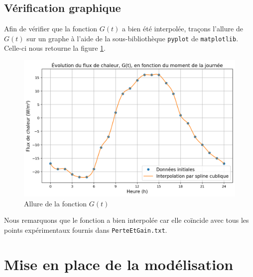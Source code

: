 \documentclass[12pt]{article}
\begin{document}
    \subsection{Vérification graphique}
        Afin de vérifier que la fonction $G(t)$ a bien été interpolée, traçons l'allure de $G(t)$ sur un graphe à l'aide de la sous-bibliothèque \texttt{pyplot} de \texttt{matplotlib}. Celle-ci nous retourne la figure \ref{fig:PerteEtGain}.
        \begin{figure}
            \centering
            \includegraphics[width=0.94\linewidth]{Rapport/figures/PerteEtGain.png}
            \caption{Allure de la fonction $G(t)$}
            \label{fig:PerteEtGain}
        \end{figure}
        Nous remarquons que le fonction a bien interpolée car elle coïncide avec tous les points expérimentaux fournis dans \texttt{PerteEtGain.txt}.
        
\section{Mise en place de la modélisation}
\end{document}
